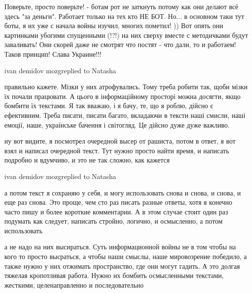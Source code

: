 Поверьте, просто поверьте! - ботам рот не заткнуть потому как они делают всё
здесь "за деньги". Работает только на тех кто НЕ БОТ. Но... в основном таки тут
боты, я их уже с начала войны изучил, многих пометил! )) Вот опять они
картинками убогими спущенными (!?!) на них сверху вместе с методичками будут
заваливать! Они скорей даже не смотрят что постят - что дали, то и работаем!
Таков принцип! Слава Украине!!!

ivan demidov mozgreplied to Natasha

правильно кажете. Мізки у них атрофувались. Тому треба робити так, щоби мізки
їх почали працювати. А цього в інформаційному просторі можна досягти, якщо
бомбити їх текстами. Я так вважаю, і я бачу, те, що я роблю, дійсно є
ефективним. Треба писати, писати багато, вкладаючи в тексти наші смисли, наші
емоції, наше, українське бачення і світогляд. Це дійсно дуже дуже важливо.

ну вот видите, я посмотрел очередной высер от рашиста, потом в ответ, я вот
взял и написал очередной текст. Тут нужно просто найти время, и написать
подробно и вдумчиво, и это не так сложно, как кажется

ivan demidov mozgreplied to Natasha

а потом текст я сохраняю у себя, и могу использовать снова и снова, и снова, и
еще раз снова. Это проще, чем сто раз писать разные ответы, хотя я конечно
часто пишу и более короткие комментарии. А в этом случае стоит один раз
подумать как следует, написать стройно, логично, и осмысленно, а потом
использовать




а не надо на них высираться. Суть информационной войны не в том чтобы на кого
то просто высраться, а чтобы наши смыслы, наше мировозрение победило, а также
нужно у них отжимать пространство, где они могут гадить. А это долгая тяжелая
кропотливая работа. Нужно их бомбить осмысленными текстами, жесткими,
целенаправленно и последовательно

